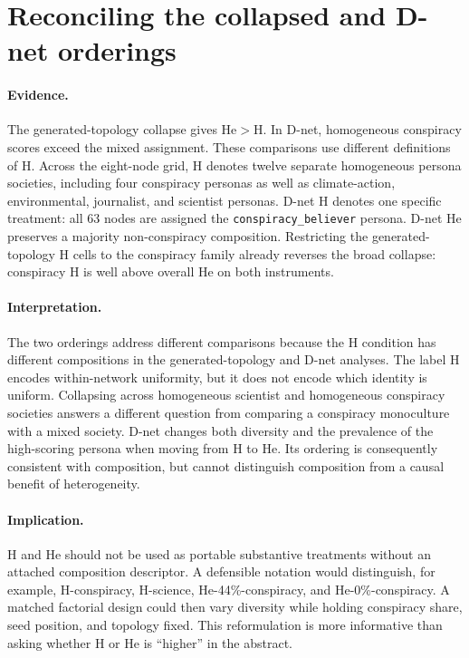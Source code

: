 \section{Reconciling the collapsed and D-net orderings}
\label{sec:discussion-reconciliation}

\paragraph{Evidence.}
The generated-topology collapse gives He$>$H. In D-net, homogeneous
conspiracy scores exceed the mixed assignment. These comparisons use
different definitions of H.
Across the eight-node grid, H denotes twelve separate homogeneous persona
societies, including four conspiracy personas as well as climate-action,
environmental, journalist, and scientist personas.  D-net H denotes one
specific treatment: all 63 nodes are assigned the
\texttt{conspiracy\_believer} persona.  D-net He preserves a majority
non-conspiracy composition.  Restricting the generated-topology H cells to
the conspiracy family already reverses the broad collapse: conspiracy H is
well above overall He on both instruments.

\paragraph{Interpretation.}
The two orderings address different comparisons because the H condition has different compositions in the generated-topology and D-net analyses.  The label H
encodes within-network uniformity, but it does not encode which identity is
uniform.  Collapsing across homogeneous scientist and homogeneous conspiracy
societies answers a different question from comparing a conspiracy monoculture
with a mixed society.  D-net changes both diversity and the prevalence of the
high-scoring persona when moving from H to He.  Its ordering is consequently
consistent with composition, but cannot distinguish composition from a
causal benefit of heterogeneity.

\paragraph{Implication.}
H and He should not be used as portable substantive treatments without an
attached composition descriptor.  A defensible notation would distinguish,
for example, H-conspiracy, H-science, He-44\%-conspiracy, and
He-0\%-conspiracy.  A matched factorial design could then vary diversity while
holding conspiracy share, seed position, and topology fixed.  This
reformulation is more informative than asking whether H or He is
\enquote{higher} in the abstract.

